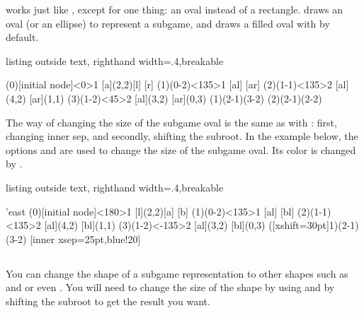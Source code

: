\cmd{\xtSubgameOval(*)} works just like \cmd{\xtSubgameBox(*)}, except for one thing: an oval instead of a rectangle.
\cmd{\xtSubgameOval} draws an oval (or an ellipse) to represent a subgame, and \cmd{\xtSubgameOval*} draws a filled oval with  by default.


\begin{tcblisting}{listing outside text, righthand width=.4\linewidth,breakable}
\begin{istgame}
\xtdistance{15mm}{30mm}
\istroot[-135](0)[initial node]<0>{1}
  [a]{(2,2)}[l]
  [r]
  \endist 
\istroot(1)(0-2)<135>{1}
  [al]
  [ar]
  \endist 
\xtdistance{10mm}{20mm}
\istroot(2)(1-1)<135>{2}
  \istb{\ell}[al]{(4,2)}
  [ar]{(1,1)}
  \endist 
\istroot(3)(1-2)<45>{2}
  \istb{\ell}[al]{(3,2)}
  [ar]{(0,3)}
  \endist 
\xtSubgameOval(1){(2-1)(3-2)}
\xtSubgameOval(2){(2-1)(2-2)}
\end{istgame}
\end{tcblisting}

The way of changing the size of the subgame oval is the same as with \cmd{\xtSubgameBox}: first, changing inner sep, and secondly, shifting the subroot.
In the example below, the options  and  are used to change the size of the subgame oval. Its color is changed by .

\begin{tcblisting}{listing outside text, righthand width=.4\linewidth,breakable}
\begin{istgame}
\setistgrowdirection'{east}
\xtdistance{15mm}{30mm}
\istroot[45](0)[initial node]<180>{1}
  [l]{(2,2)}[a]
  [b]
  \endist 
\istroot(1)(0-2)<135>{1}
  [al]
  [bl]
  \endist 
\xtdistance{10mm}{20mm}
\istroot(2)(1-1)<135>{2}
  \istb{\ell}[al]{(4,2)}
  [bl]{(1,1)}
  \endist 
\istroot(3)(1-2)<-135>{2}
  \istb{\ell}[al]{(3,2)}
  [bl]{(0,3)}
  \endist 
\xtSubgameOval*([xshift=30pt]1){(2-1)(3-2)}%
    [inner xsep=25pt,blue!20]
\end{istgame}
\end{tcblisting}

\subsection{\protect\cmd{\setxtsubgamelayer}}

You can change the shape of a subgame representation to other shapes such as  and  or even . You will need to change the size of the shape by using  and by shifting the subroot to get the result you want.

